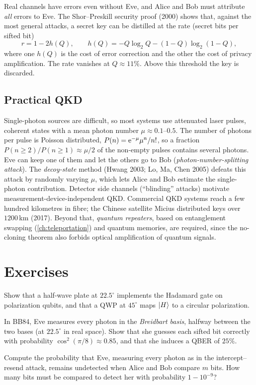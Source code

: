 \begin{caveat}
Real channels have errors even without Eve, and Alice and Bob must attribute \emph{all} errors to Eve. The Shor--Preskill security proof (2000)
shows that, against the most general attacks, a secret key can be distilled at the rate (secret bits per sifted bit)
\begin{equation}
  r=1-2h(Q),\qquad h(Q)=-Q\log_2Q-(1-Q)\log_2(1-Q),
\end{equation}
where one $h(Q)$ is the cost of error correction and the other the cost of privacy amplification. The rate vanishes at $Q\approx11\%$. Above this threshold
the key is discarded.
\end{caveat}

\subsection{Practical QKD}
Single-photon sources are difficult, so most systems use attenuated laser pulses, coherent states with a mean photon number $\mu\approx0.1$--$0.5$. The number of
photons per pulse is Poisson distributed, $P(n)=\mathrm e^{-\mu}\mu^n/n!$, so a fraction $P(n\ge2)/P(n\ge1)\approx\mu/2$ of the non-empty pulses contains several photons.
Eve can keep one of them and let the others go to Bob (\emph{photon-number-splitting attack}). The \emph{decoy-state} method (Hwang 2003; Lo, Ma, Chen 2005)
defeats this attack by randomly varying $\mu$, which lets Alice and Bob estimate the single-photon contribution. Detector side channels (``blinding'' attacks)
motivate measurement-device-independent QKD. Commercial QKD systems reach a few hundred kilometres in fibre; the Chinese satellite Micius distributed keys
over $1200$\,km (2017). Beyond that, \emph{quantum repeaters}, based on entanglement swapping (\cref{ch:teleportation}) and quantum memories, are required, since
the no-cloning theorem also forbids optical amplification of quantum signals.

\section{Exercises}
\begin{exercise}
Show that a half-wave plate at $22.5^\circ$ implements the Hadamard gate on polarization qubits, and that a QWP at $45^\circ$ maps $\left|H\right\rangle$ to a circular polarization.
\end{exercise}
\begin{exercise}
In BB84, Eve measures every photon in the \emph{Breidbart basis}, halfway between the two bases (at $22.5^\circ$ in real space). Show that she guesses
each sifted bit correctly with probability $\cos^2(\pi/8)\approx0.85$, and that she induces a QBER of $25\%$.
\end{exercise}
\begin{exercise}
Compute the probability that Eve, measuring every photon as in the intercept--resend attack, remains undetected when Alice and Bob compare $m$ bits. How many bits must
be compared to detect her with probability $1-10^{-9}$?
\end{exercise}
